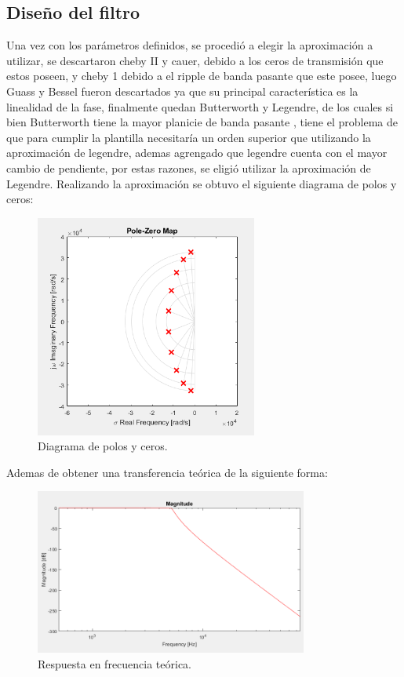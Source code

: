 \subsection{Diseño del filtro}
 Una vez con los parámetros definidos, se procedió  a elegir la aproximación a utilizar, se descartaron cheby II y cauer, debido a los ceros de transmisión que estos poseen, y cheby 1 debido a el ripple de banda pasante que este posee, luego Guass y Bessel fueron descartados ya que su principal característica es la linealidad de la fase, finalmente quedan Butterworth y Legendre, de los cuales si bien  Butterworth tiene la mayor planicie de banda pasante , tiene el problema de que para cumplir la plantilla necesitaría un orden superior que utilizando la aproximación de legendre, ademas agrengado que legendre cuenta con el mayor cambio de pendiente, por estas razones, se eligió utilizar la aproximación de Legendre.
 Realizando la aproximación se obtuvo el siguiente diagrama de polos y ceros:
 \begin{figure}[H]
	\centering
	\includegraphics[width=0.65\textwidth]{ImagenesEjercicio2/polosyceros.PNG}
\caption{Diagrama de polos y ceros.}
	\label{fig:polosyceros}
\end{figure}
Ademas de obtener una transferencia teórica de la siguiente forma:
 \begin{figure}[H]
	\centering
	\includegraphics[width=0.8\textwidth]{ImagenesEjercicio2/atenuation.PNG}
\caption{Respuesta en frecuencia teórica.}
	\label{fig:transteorica}
\end{figure}
